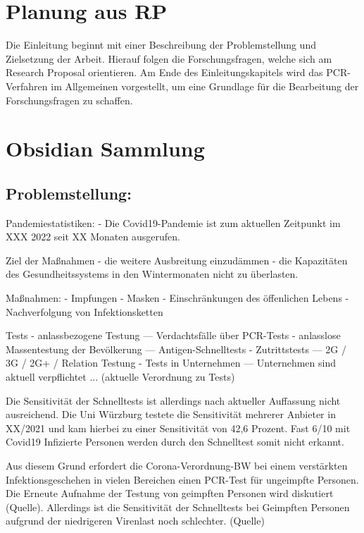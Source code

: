 \cleardoublepage

\section{Planung aus RP}
Die Einleitung beginnt mit einer Beschreibung der Problemstellung und Zielsetzung der Arbeit.
Hierauf folgen die Forschungsfragen, welche sich am Research Proposal orientieren.
Am Ende des Einleitungskapitels wird das PCR-Verfahren im Allgemeinen vorgestellt, um eine Grundlage für die Bearbeitung der Forschungsfragen zu schaffen.

\section{Obsidian Sammlung}
\subsection{Problemstellung:}
Pandemiestatistiken:
- Die Covid19-Pandemie ist zum aktuellen Zeitpunkt im XXX 2022 seit XX Monaten ausgerufen.

Ziel der Maßnahmen
- die weitere Ausbreitung einzudämmen
- die Kapazitäten des Gesundheitssystems in den Wintermonaten nicht zu überlasten.

Maßnahmen:
- Impfungen
- Masken
- Einschränkungen des öffenlichen Lebens
- Nachverfolgung von Infektionsketten

Tests
- anlassbezogene Testung
--- Verdachtsfälle über PCR-Tests
- anlasslose Massentestung der Bevölkerung
--- Antigen-Schnelltests
- Zutrittstests
--- 2G / 3G / 2G+ / Relation Testung
- Tests in Unternehmen
--- Unternehmen sind aktuell verpflichtet ... (aktuelle Verordnung zu Tests)

Die Sensitivität der Schnelltests ist allerdings nach aktueller Auffassung nicht ausreichend. Die Uni Würzburg testete die Sensitivität mehrerer Anbieter in XX/2021 und kam hierbei zu einer Sensitivität von 42,6 Prozent. Fast 6/10 mit Covid19 Infizierte Personen werden durch den Schnelltest somit nicht erkannt.

Aus diesem Grund erfordert die Corona-Verordnung-BW bei einem verstärkten Infektionsgeschehen in vielen Bereichen einen PCR-Test für ungeimpfte Personen. Die Erneute Aufnahme der Testung von geimpften Personen wird diskutiert (Quelle). Allerdings ist die Sensitivität der Schnelltests bei Geimpften Personen aufgrund der niedrigeren Virenlast noch schlechter. (Quelle)

